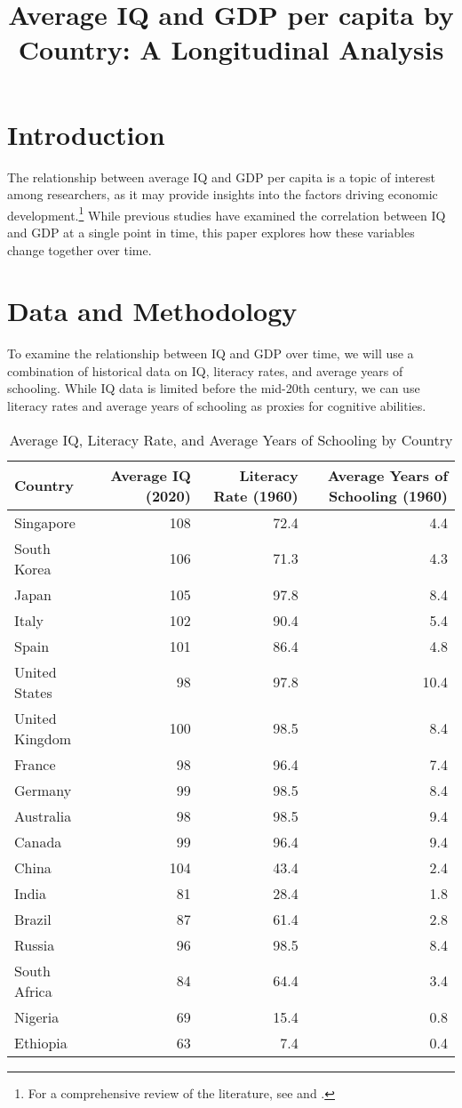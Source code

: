 \documentclass{article}
\begin{document}
\title{Average IQ and GDP per capita by Country: A Longitudinal Analysis}
\author{}
\date{}
\maketitle

\section{Introduction}

The relationship between average IQ and GDP per capita is a topic of interest among researchers, as it may provide insights into the factors driving economic development.\footnote{For a comprehensive review of the literature, see \cite{LynnVanhanen2012} and \cite{Rindermann2018}.} While previous studies have examined the correlation between IQ and GDP at a single point in time, this paper explores how these variables change together over time.

\section{Data and Methodology}

To examine the relationship between IQ and GDP over time, we will use a combination of historical data on IQ, literacy rates, and average years of schooling. While IQ data is limited before the mid-20th century, we can use literacy rates and average years of schooling as proxies for cognitive abilities.

\begin{table}[h!]
\centering
\begin{tabular}{lrrr}
\toprule
Country & Average IQ (2020) & Literacy Rate (1960) & Average Years of Schooling (1960) \\
\midrule
Singapore &108 & 72.4 & 4.4 \\
South Korea &106 & 71.3 & 4.3 \\
Japan &105 & 97.8 & 8.4 \\
Italy &102 & 90.4 & 5.4 \\
Spain &101 & 86.4 & 4.8 \\
United States &98 & 97.8 & 10.4 \\
United Kingdom &100 & 98.5 & 8.4 \\
France &98 & 96.4 & 7.4 \\
Germany &99 & 98.5 & 8.4 \\
Australia &98 & 98.5 & 9.4 \\
Canada &99 & 96.4 & 9.4 \\
China &104 & 43.4 & 2.4 \\
India &81 & 28.4 & 1.8 \\
Brazil &87 & 61.4 & 2.8 \\
Russia &96 & 98.5 & 8.4 \\
South Africa &84 & 64.4 & 3.4 \\
Nigeria &69 & 15.4 & 0.8 \\
Ethiopia &63 & 7.4 & 0.4 \\
\bottomrule
\end{tabular}
\caption{Average IQ, Literacy Rate, and Average Years of Schooling by Country}
\label{tab:iq_literacy}
\end{table}
\end{document}
